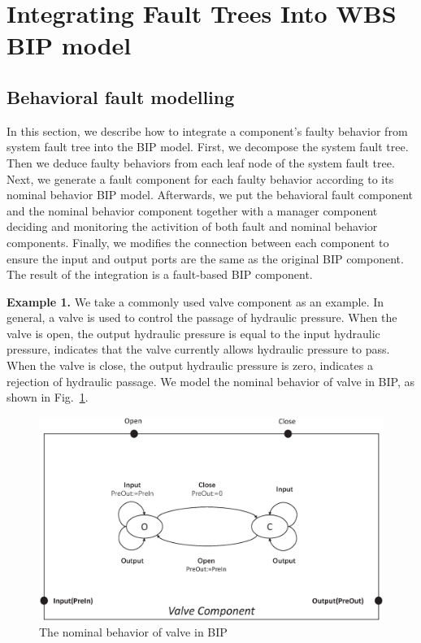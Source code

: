 

\section{Integrating Fault Trees Into WBS BIP model}

\subsection{Behavioral fault modelling}
In this section, we describe how to integrate a component's faulty behavior from system fault tree\cite{ft} into the BIP model. First, we decompose the system fault tree. Then we deduce faulty behaviors from each leaf node of the system fault tree. Next, we generate a fault component for each faulty behavior according to its nominal behavior BIP model. Afterwards, we put the behavioral fault component and the nominal behavior component together with a manager component deciding and monitoring the activition of both fault and nominal behavior components. Finally, we modifies the connection between each component to ensure the input and output ports are the same as the original BIP component. The result of the integration is a fault-based BIP component.


\textbf{Example 1.} We take a commonly used valve component as an example. In general, a valve is used to control the passage of hydraulic pressure. When the valve is open, the output hydraulic pressure is equal to the input hydraulic pressure, indicates that the valve currently allows hydraulic pressure to pass. When the valve is close, the output hydraulic pressure is zero, indicates a rejection of hydraulic passage. We model the nominal behavior of valve in BIP, as shown in Fig.~\ref{example_BIP_nominal}.

\begin{figure}[htbp]
	\centerline{\includegraphics[width=115mm]{figure/example_origin.eps}}
	\caption{The nominal behavior of valve in BIP}
	\label{example_BIP_nominal}
\end{figure}

